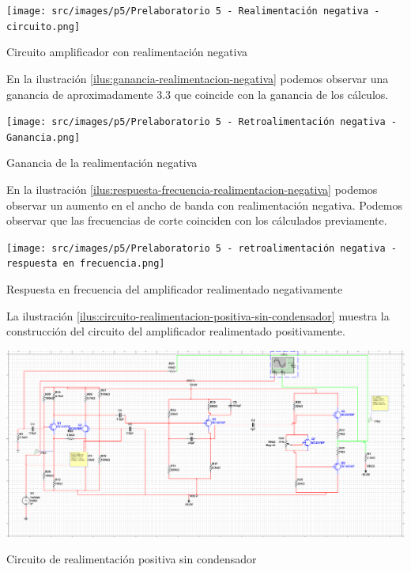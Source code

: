 \begin{ilustracion}[ht]
    \centering
    \texttt{[image: src/images/p5/Prelaboratorio 5 - Realimentación negativa - circuito.png]}
    \caption{Circuito amplificador con realimentación negativa}
    \label{ilus:amplificador-realimentado-negativo}
\end{ilustracion}
\FloatBarrier

En la ilustración \ref{ilus:ganancia-realimentacion-negativa} podemos observar una ganancia de aproximadamente $3.3$ que coincide con la ganancia de los cálculos.

\begin{ilustracion}[ht]
    \centering
    \texttt{[image: src/images/p5/Prelaboratorio 5 - Retroalimentación negativa - Ganancia.png]}
    \caption{Ganancia de la realimentación negativa}
    \label{ilus:ganancia-realimentacion-negativa}
\end{ilustracion}

En la ilustración \ref{ilus:respuesta-frecuencia-realimentacion-negativa} podemos observar un aumento en el ancho de banda con realimentación negativa. Podemos observar que las frecuencias de corte coinciden con los cálculados previamente.

\begin{ilustracion}[ht]
    \centering
    \texttt{[image: src/images/p5/Prelaboratorio 5 - retroalimentación negativa - respuesta en frecuencia.png]}
    \caption{Respuesta en frecuencia del amplificador realimentado negativamente}
    \label{ilus:respuesta-frecuencia-realimentacion-negativa}
\end{ilustracion}
\FloatBarrier


La ilustración \ref{ilus:circuito-realimentacion-positiva-sin-condensador} muestra la construcción del circuito del amplificador realimentado positivamente.

\begin{ilustracion}[ht]
    \centering
    \includegraphics[width=\textwidth]{src/images/p5/Prelaboratorio 5 - Realimentacion positiva sin condensador - circuito.png}
    \caption{Circuito de realimentación positiva sin condensador}
    \label{ilus:circuito-realimentacion-positiva-sin-condensador}
\end{ilustracion}

